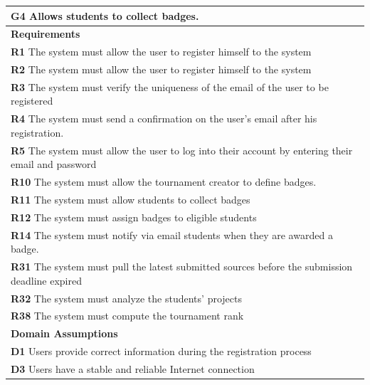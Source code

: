 \begin{table}[H]
    \begin{tabularx}{\textwidth}{X}
        \toprule
        \textbf{G4} Allows students to collect badges.                                                 \\ \midrule
        \textbf{Requirements}                                                                                                        \\ \midrule
        \textbf{R1} The system must allow the user to register himself to the system                                                  \\
        \textbf{R2} The system must allow the user to register himself to the system                                               \\ 
        \textbf{R3} The system must verify the uniqueness of the email of the user to be registered                                        \\ 
        \textbf{R4} The system must send a confirmation on the user's email after his registration.                         \\ 
        \textbf{R5} The system must allow the user to log into their account by entering their email and password           \\ 
        \textbf{R10} The system must allow the tournament creator to define badges.      \\ 
        \textbf{R11} The system must allow students to collect badges        \\ 
        \textbf{R12} The system must assign badges to eligible students          \\  
        \textbf{R14} The system must notify via email students when they are awarded a badge. \\ 
        \textbf{R31} The system must pull the latest submitted sources before the submission deadline expired     \\ 
        \textbf{R32} The system must analyze the students' projects      \\ 
        \textbf{R38} The system must compute the tournament rank                 \\ 
        \midrule
        \textbf{Domain Assumptions}                                                                                                  \\ \midrule
        \textbf{D1} Users provide correct information during the registration process \\          
        \textbf{D3} Users have a stable and reliable Internet connection \\
        \bottomrule
    \end{tabularx}
\end{table}

